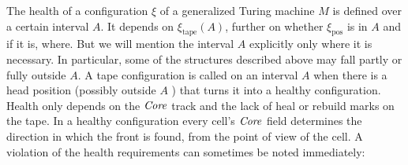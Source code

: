 \documentclass[11pt]{memoir}
\theoremstyle{definition} %
\newcommand{\fld}[1]{\ensuremath{\textit{#1\/}}}
\newcommand{\pos}{\mathrm{pos}}
\newcommand{\tape}{\mathrm{tape}}
\newcommand{\TransferSw}{\mathrm{TransferSw}}
\newcommand{\Core}{\fld{Core}}
\newcommand{\Drift}{\fld{Drift}}
\newcommand{\Sweep}{\fld{Sweep}} %
\newcommand{\Member}{\mathrm{Member}}
\begin{document}
The health of a configuration \( \xi \) of a generalized Turing machine 
\( M \) is defined over a certain interval \( A \).
It depends on \( \xi_{\tape}(A) \), further on whether \( \xi_{\pos} \) is in \( A \) and
if it is, where.
But we will mention the interval \( A \) explicitly only where it is necessary.
In particular, some of the structures described above may fall partly or fully
outside \( A \).
A tape configuration is called  on an interval \( A \)
when there is a head position (possibly outside \( A \) ) that turns it into a healthy configuration.
Health only depends on the \( \Core \) track
and the lack of heal or rebuild marks on the tape.
In a healthy configuration every cell's \( \Core \) field
determines the direction in which the front is found, from the point of
view of the cell.
A violation of the health requirements can sometimes be noted immediately:



        
\end{document}
